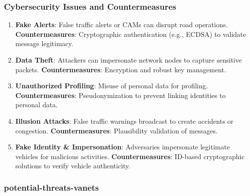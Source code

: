 \subsubsection{Cybersecurity Issues and Countermeasures}
\begin{enumerate}
    \item \textbf{Fake Alerts}: False traffic alerts or CAMs can disrupt road operations. \textbf{Countermeasures}: Cryptographic authentication (e.g., ECDSA) to validate message legitimacy.
    \item \textbf{Data Theft}: Attackers can impersonate network nodes to capture sensitive packets. \textbf{Countermeasures}: Encryption and robust key management.
    \item \textbf{Unauthorized Profiling}: Misuse of personal data for profiling. \textbf{Countermeasures}: Pseudonymization to prevent linking identities to personal data.
    \item \textbf{Illusion Attacks}: False traffic warnings broadcast to create accidents or congestion. \textbf{Countermeasures}: Plausibility validation of messages.
    \item \textbf{Fake Identity \& Impersonation}: Adversaries impersonate legitimate vehicles for malicious activities. \textbf{Countermeasures}: ID-based cryptographic solutions to verify vehicle authenticity.
\end{enumerate}


\subsubsection{potential-threats-vanets}\label{subsubsec:potentials-threats-vanets}

